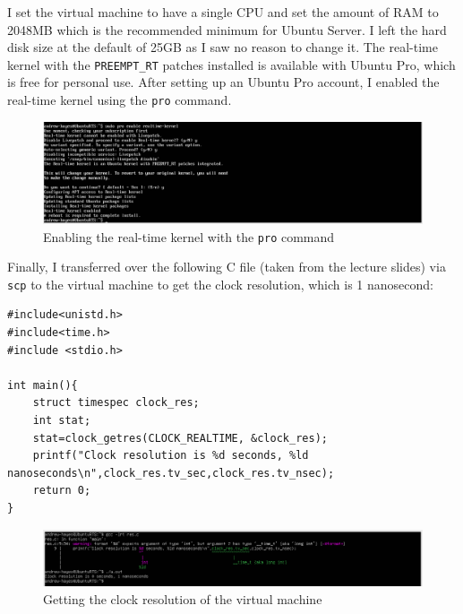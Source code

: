 \documentclass[a4paper]{article}
\newenvironment{code}{\captionsetup{type=listing}}{}
\begin{document}
I set the virtual machine to have a single CPU and set the amount of RAM to 2048MB which is the recommended minimum for Ubuntu Server\supercite{ubuntu_server_installation}.
I left the hard disk size at the default of 25GB as I saw no reason to change it.
The real-time kernel with the \verb|PREEMPT_RT| patches installed is available with Ubuntu Pro, which is free for personal use.
After setting up an Ubuntu Pro account, I enabled the real-time kernel using the \texttt{pro} command.

\begin{figure}[H]
    \centering
    \includegraphics[width=\textwidth]{./images/proenable.png}
    \caption{Enabling the real-time kernel with the \texttt{pro} command}
\end{figure}

Finally, I transferred over the following C file (taken from the lecture slides) via \texttt{scp} to the virtual machine to get the clock resolution, which is 1 nanosecond:
\begin{code}
\begin{verbatim}
#include<unistd.h>
#include<time.h>
#include <stdio.h>

int main(){
    struct timespec clock_res;
    int stat;
    stat=clock_getres(CLOCK_REALTIME, &clock_res);
    printf("Clock resolution is %d seconds, %ld nanoseconds\n",clock_res.tv_sec,clock_res.tv_nsec);
    return 0;
}
\end{verbatim}
\end{code}

\begin{figure}[H]
    \centering
    \includegraphics[width=\textwidth]{./images/clockres.png}
    \caption{Getting the clock resolution of the virtual machine}
\end{figure}




\printbibliography
\end{document}
